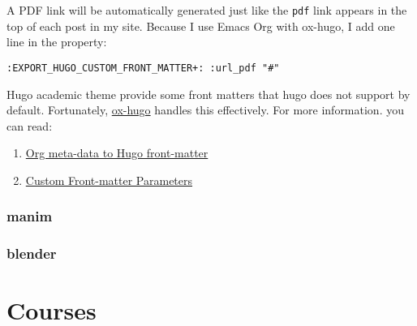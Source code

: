 \documentclass[koma,utopia,a4paper,captions=tableheading,11pt,listings-sv,microtype,paralist,colorlinks=true,urlcolor=blue]{org-article}
\begin{document}
A PDF link will be automatically generated just like the \texttt{pdf} link appears in
the top of each post in my site. Because I use Emacs Org with ox-hugo, I add one
line in the property:

\begin{verbatim}
:EXPORT_HUGO_CUSTOM_FRONT_MATTER+: :url_pdf "#"
\end{verbatim}

Hugo academic theme provide some front matters that hugo does not support by
default. Fortunately, \href{https://github.com/kaushalmodi/ox-hugo}{ox-hugo} handles this effectively. For more information.
you can read:
\begin{enumerate}
\item \href{https://ox-hugo.scripter.co/doc/org-meta-data-to-hugo-front-matter/}{Org meta-data to Hugo front-matter}
\item \href{https://ox-hugo.scripter.co/doc/custom-front-matter/}{Custom Front-matter Parameters}
\end{enumerate}


\subsubsection{manim}
\label{sec:org022fb8d}



\subsubsection{blender}
\label{sec:org7659274}

\section{Courses}
\label{sec:org85ca59f}
\end{document}
